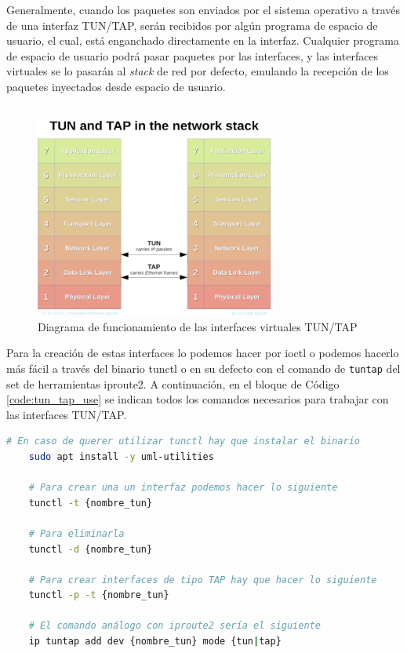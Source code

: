 Generalmente, cuando los paquetes son enviados por el sistema operativo a través de una interfaz TUN/TAP,  serán recibidos por algún programa de espacio de usuario, el cual, está enganchado directamente en la interfaz. Cualquier programa de espacio de usuario podrá pasar paquetes por las interfaces, y las interfaces virtuales se lo pasarán al \textit{stack} de red por defecto, emulando la recepción de los paquetes inyectados desde espacio de usuario.\\
\\
\begin{figure}[ht]
    \centering
    \includegraphics[width=0.7\textwidth]{archivos/img/teoria/linux1.png}
    \caption{Diagrama de funcionamiento de las interfaces virtuales TUN/TAP \cite{tuntap2}}
    \label{fig:linux1}
\end{figure}

Para la creación de estas interfaces lo podemos hacer por ioctl o podemos hacerlo más fácil a través del binario tunctl o en su defecto con el comando de \texttt{tuntap} del set de herramientas iproute2. A continuación, en el bloque de Código \ref{code:tun_tap_use} se indican todos los comandos necesarios para trabajar con las interfaces TUN/TAP.\\

\begin{lstlisting}[language= bash, style=Consola, caption={Manejo de interfaces TUN - TAP},label=code:tun_tap_use]
    # En caso de querer utilizar tunctl hay que instalar el binario
    sudo apt install -y uml-utilities
    
    # Para crear una un interfaz podemos hacer lo siguiente
    tunctl -t {nombre_tun}

    # Para eliminarla
    tunctl -d {nombre_tun}

    # Para crear interfaces de tipo TAP hay que hacer lo siguiente
    tunctl -p -t {nombre_tun}
    
    # El comando análogo con iproute2 sería el siguiente
    ip tuntap add dev {nombre_tun} mode {tun|tap}
\end{lstlisting}
\vspace{0.5cm}

